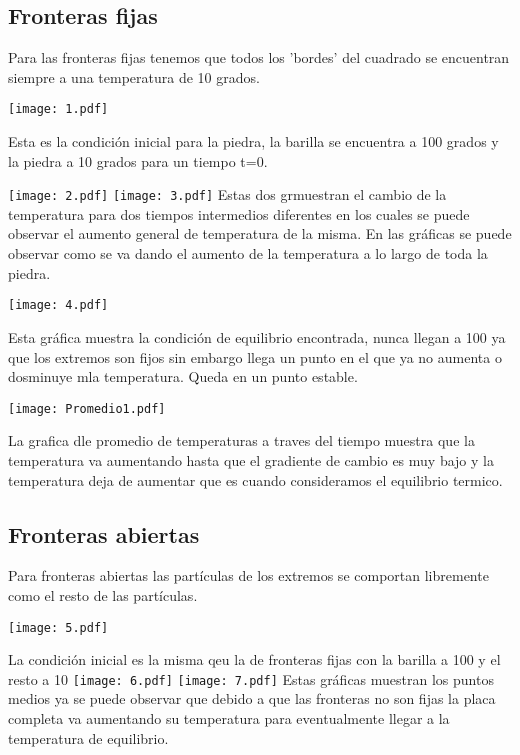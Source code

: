 \documentclass[a4paper,11pt]{article}
\begin{document}
\subsection{Fronteras fijas}

Para las fronteras fijas tenemos que todos los 'bordes' del cuadrado se encuentran siempre a una temperatura de 10 grados.

\begin{center}
\texttt{[image: 1.pdf]}
\end{center}
Esta es la condici\'on inicial para la piedra, la barilla se encuentra a 100 grados y la piedra a 10 grados para un tiempo t=0.

\texttt{[image: 2.pdf]}
\texttt{[image: 3.pdf]}
Estas dos gr\aficas muestran el cambio de la temperatura para dos tiempos intermedios diferentes en los cuales se puede observar el aumento general de temperatura de la misma. En las gr\'aficas se puede observar como se va dando el aumento de la temperatura a lo largo de toda la piedra.

\begin{center}
\texttt{[image: 4.pdf]}
\end{center}
Esta gr\'afica muestra la condici\'on de equilibrio encontrada, nunca llegan a 100 ya que los extremos son fijos sin embargo llega un punto en el que ya no aumenta o dosminuye m\as la temperatura. Queda en un punto estable.

\begin{center}
\texttt{[image: Promedio1.pdf]}
\end{center}
La grafica dle promedio de temperaturas a traves del tiempo muestra que la temperatura va aumentando hasta que el gradiente de cambio es muy bajo y la temperatura deja de aumentar que es cuando consideramos el equilibrio termico.

\subsection{Fronteras abiertas}
Para fronteras abiertas las part\'iculas de los extremos se comportan libremente como el resto de las part\'iculas.

\begin{center}
\texttt{[image: 5.pdf]}
\end{center}
La condici\'on inicial es la misma qeu la de fronteras fijas con la barilla a 100 y el resto a 10
\texttt{[image: 6.pdf]}
\texttt{[image: 7.pdf]}
Estas gr\'aficas muestran los puntos medios ya se puede observar que debido a que las fronteras no son fijas la placa completa va aumentando su temperatura para eventualmente llegar a la temperatura de equilibrio.
\end{document}
